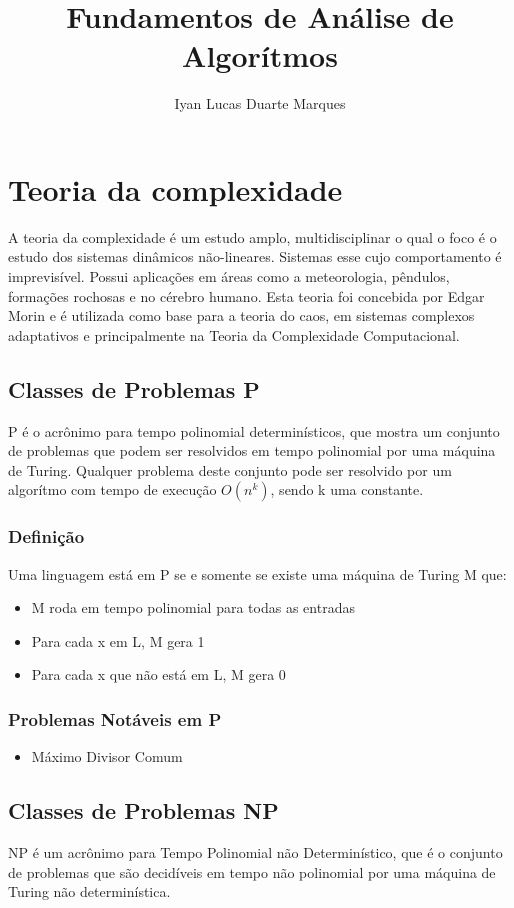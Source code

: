 \documentclass[12pt]{article}
\title{Fundamentos de Análise de Algorítmos}
\author{Iyan Lucas Duarte Marques\inst{1}}
\begin{document}
\maketitle

\section{Teoria da complexidade}
A teoria da complexidade é um estudo amplo, multidisciplinar o qual o foco é o estudo dos sistemas dinâmicos não-lineares.
Sistemas esse cujo comportamento é imprevisível.
Possui aplicações em áreas como a meteorologia, pêndulos, formações rochosas e no cérebro humano.
Esta teoria foi concebida por Edgar Morin e é utilizada como base para a teoria do caos, em sistemas complexos adaptativos e principalmente na Teoria da Complexidade Computacional.
\subsection{Classes de Problemas P}
    P é o acrônimo para tempo polinomial determinísticos, que mostra um conjunto de problemas que podem ser resolvidos em tempo polinomial por uma máquina de Turing.
    Qualquer problema deste conjunto pode ser resolvido por um algorítmo com tempo de execução $O(n^k)$, sendo k uma constante.
        \subsubsection{Definição}
            Uma linguagem está em P se e somente se existe uma máquina de Turing M que:
            \begin{itemize}
                \item M roda em tempo polinomial para todas as entradas
                \item Para cada x em L, M gera 1
                \item Para cada x que não está em L, M gera 0
            \end{itemize} 
        \subsubsection{Problemas Notáveis em P}
            \begin{itemize}
                \item Máximo Divisor Comum
            \end{itemize}
    \subsection{Classes de Problemas NP}
        NP é um acrônimo para Tempo Polinomial não Determinístico, que é o conjunto de problemas que são decidíveis em tempo não polinomial por uma máquina de Turing não determinística.
\end{document}
